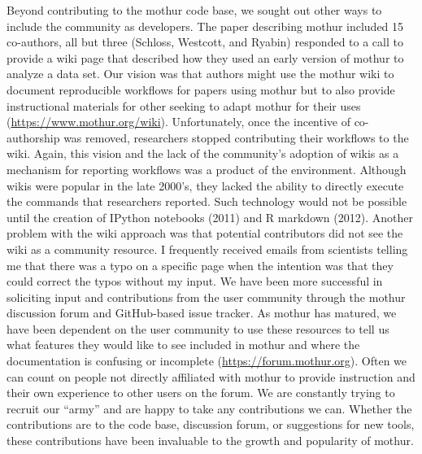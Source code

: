 \documentclass[11pt,]{article}
\begin{document}
Beyond contributing to the mothur code base, we sought out other ways to
include the community as developers. The paper describing mothur
included 15 co-authors, all but three (Schloss, Westcott, and Ryabin)
responded to a call to provide a wiki page that described how they used
an early version of mothur to analyze a data set. Our vision was that
authors might use the mothur wiki to document reproducible workflows for
papers using mothur but to also provide instructional materials for
other seeking to adapt mothur for their uses
(\url{https://www.mothur.org/wiki}). Unfortunately, once the incentive
of co-authorship was removed, researchers stopped contributing their
workflows to the wiki. Again, this vision and the lack of the
community's adoption of wikis as a mechanism for reporting workflows was
a product of the environment. Although wikis were popular in the late
2000's, they lacked the ability to directly execute the commands that
researchers reported. Such technology would not be possible until the
creation of IPython notebooks (2011) and R markdown (2012). Another
problem with the wiki approach was that potential contributors did not
see the wiki as a community resource. I frequently received emails from
scientists telling me that there was a typo on a specific page when the
intention was that they could correct the typos without my input. We
have been more successful in soliciting input and contributions from the
user community through the mothur discussion forum and GitHub-based
issue tracker. As mothur has matured, we have been dependent on the user
community to use these resources to tell us what features they would
like to see included in mothur and where the documentation is confusing
or incomplete (\url{https://forum.mothur.org}). Often we can count on
people not directly affiliated with mothur to provide instruction and
their own experience to other users on the forum. We are constantly
trying to recruit our ``army'' and are happy to take any contributions
we can. Whether the contributions are to the code base, discussion
forum, or suggestions for new tools, these contributions have been
invaluable to the growth and popularity of mothur.
\end{document}
